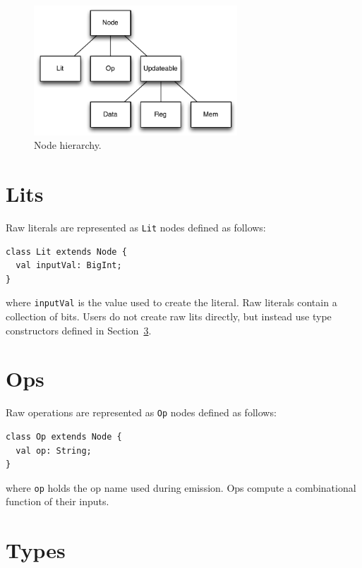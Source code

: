 \documentclass[10pt,twocolumn]{article}
\def\code#1{{\small\tt #1}}
\begin{document}
\begin{figure}[h]
\centering
\includegraphics[width=3in]{figs/node-hierarchy.pdf}
\caption{Node hierarchy.}
\label{fig:node-hierarchy}
\end{figure}

\section{Lits}

Raw literals are represented as \code{Lit} nodes defined as follows:

\begin{lstlisting}
class Lit extends Node {
  val inputVal: BigInt;
}
\end{lstlisting}

\noindent
where \code{inputVal} is the value used to create the literal.  
Raw literals contain a collection of bits.  
Users do not create raw lits directly, but instead use type
constructors defined in Section~\ref{sec:types}.



\section{Ops}

Raw operations are represented as \code{Op} nodes defined as follows:

\begin{lstlisting}
class Op extends Node {
  val op: String;
}
\end{lstlisting}

\noindent
where \code{op} holds the op name used during emission.  
Ops compute a combinational function of their inputs.

\section{Types}
\label{sec:types}
\end{document}
